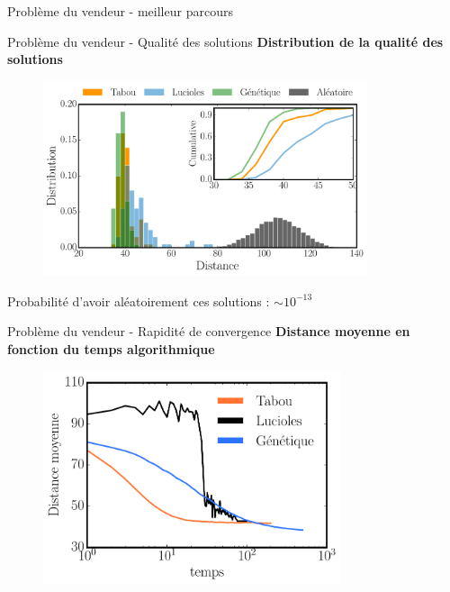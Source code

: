 \documentclass{beamer}
\begin{document}
\begin{frame}{Problème du vendeur - meilleur parcours}


\end{frame}



\begin{frame}{Problème du vendeur - Qualité des solutions}
  \textbf{Distribution de la qualité des solutions}
  \begin{figure}[h!]
    \centering
    \includegraphics[width=0.85\textwidth]{figures/distri_distance22.pdf}
  \end{figure}
  \pause
  \vspace{-0.8cm}
  Probabilité d'avoir aléatoirement ces solutions : $\sim 10^{-13}$
\end{frame}

\begin{frame}{Problème du vendeur - Rapidité de convergence}
  \textbf{Distance moyenne en fonction du temps algorithmique}
  \begin{figure}[h!]
    \centering
    \includegraphics[width=0.78\textwidth]{figures/speedtest.pdf}
  \end{figure}
\end{frame}
\end{document}
